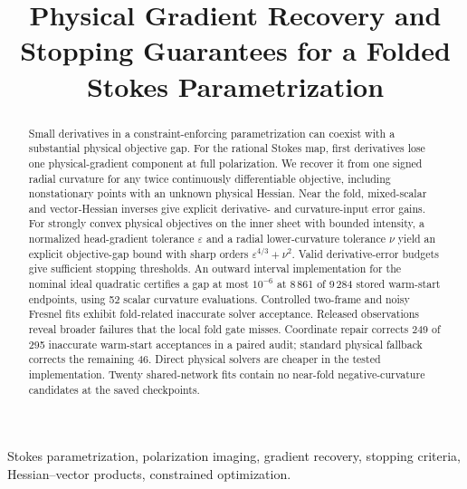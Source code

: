 \documentclass[nolineno]{ieeeaccess}
\begin{document}
\doi{}
\title{Physical Gradient Recovery and Stopping Guarantees for a Folded Stokes Parametrization}

\begin{abstract}
Small derivatives in a constraint-enforcing parametrization can coexist with a substantial physical objective gap. For the rational Stokes map, first derivatives lose one physical-gradient component at full polarization. We recover it from one signed radial curvature for any twice continuously differentiable objective, including nonstationary points with an unknown physical Hessian. Near the fold, mixed-scalar and vector-Hessian inverses give explicit derivative- and curvature-input error gains. For strongly convex physical objectives on the inner sheet with bounded intensity, a normalized head-gradient tolerance $\varepsilon$ and a radial lower-curvature tolerance $\nu$ yield an explicit objective-gap bound with sharp orders $\varepsilon^{4/3}+\nu^2$. Valid derivative-error budgets give sufficient stopping thresholds. An outward interval implementation for the nominal ideal quadratic certifies a gap at most $10^{-6}$ at 8\,861 of 9\,284 stored warm-start endpoints, using 52 scalar curvature evaluations. Controlled two-frame and noisy Fresnel fits exhibit fold-related inaccurate solver acceptance. Released observations reveal broader failures that the local fold gate misses. Coordinate repair corrects 249 of 295 inaccurate warm-start acceptances in a paired audit; standard physical fallback corrects the remaining 46. Direct physical solvers are cheaper in the tested implementation. Twenty shared-network fits contain no near-fold negative-curvature candidates at the saved checkpoints.
\end{abstract}
\begin{keywords}
Stokes parametrization, polarization imaging, gradient recovery, stopping criteria, Hessian--vector products, constrained optimization.
\end{keywords}
\titlepgskip=-37.8pt
\maketitle

\FloatBarrier


\end{document}
